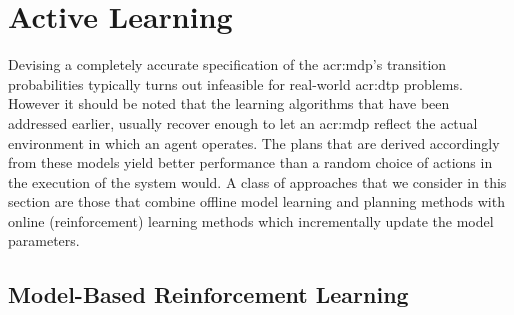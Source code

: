 %
%

%
%

\section{Active Learning}
\label{sec:active-learning}

Devising a completely accurate specification of the \acrshort{acr:mdp}'s transition probabilities typically turns out infeasible for real-world \acrshort{acr:dtp} problems.
However it should be noted that the learning algorithms that have been addressed earlier, usually recover enough to let an \acrshort{acr:mdp} reflect the actual environment in which an agent operates.
The plans that are derived accordingly from these models yield better performance than a random choice of actions in the execution of the system would.
A class of approaches that we consider in this section are those that combine offline model learning and planning methods with online (reinforcement) learning methods which incrementally update the model parameters.

\subsection{Model-Based Reinforcement Learning}
\label{sec:model-based-reinforcement-learning}

